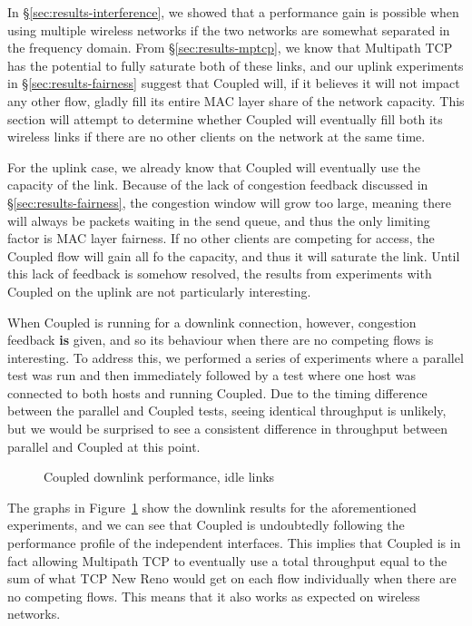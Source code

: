 In \S\ref{sec:results-interference}, we showed that a performance gain is
possible when using multiple wireless networks if the two networks are somewhat 
separated in the frequency domain. From \S\ref{sec:results-mptcp}, we know that 
Multipath TCP has the potential to fully saturate both of these links, and
our uplink experiments in \S\ref{sec:results-fairness} suggest that 
Coupled will, if it believes it will not impact any other flow, gladly fill 
its entire MAC layer share of the network capacity. This section will attempt to 
determine whether Coupled will eventually fill both its wireless links if there 
are no other clients on the network at the same time.

For the uplink case, we already know that Coupled will eventually use the
capacity of the link. Because of the lack of congestion feedback discussed in
\S\ref{sec:results-fairness}, the congestion window will grow too large,
meaning there will always be packets waiting in the send queue, and thus the
only limiting factor is MAC layer fairness. If no other clients are competing
for access, the Coupled flow will gain all fo the capacity, and thus it
will saturate the link. Until this lack of feedback is somehow resolved, the 
results from experiments with Coupled on the uplink are not particularly
interesting.

When Coupled is running for a downlink connection, however, congestion feedback
\textbf{is} given, and so its behaviour when there are no competing flows is 
interesting. To address this, we performed a series of 
experiments where a parallel test was run and then immediately followed by a 
test where one host was connected to both hosts and running Coupled. Due to the 
timing difference between the parallel and Coupled tests, seeing identical 
throughput is unlikely, but we would be surprised to see a consistent difference 
in throughput between parallel and Coupled at this point.

\begin{figure}[h]
 \centering
 
 \caption{Coupled downlink performance, idle links}\label{graph:coupled-performance}
\end{figure}

The graphs in Figure~\ref{graph:coupled-performance} show the downlink results
for the aforementioned experiments, and we can see that Coupled is undoubtedly
following the performance profile of the independent interfaces. This implies
that Coupled is in fact allowing Multipath TCP to eventually use a total
throughput equal to the sum of what TCP New Reno would get on each flow
individually when there are no competing flows. This means that it also works as
expected on wireless networks.
